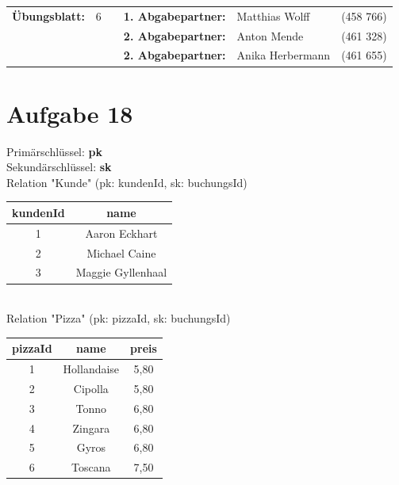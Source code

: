 \newcommand{\obenlinks}{Software Engineering}		%

\usepackage{float}


	\begin{center}
		\begin{tabular}{|rlp{4cm}rll|}
		\hline
		 \textbf{Übungsblatt:} & 6 &   & \textbf{1. Abgabepartner:} & Matthias Wolff & (458 766)  \\
		        & & & \textbf{2. Abgabepartner:} & Anton Mende & (461 328) \\
		        & & & \textbf{2. Abgabepartner:} & Anika Herbermann & (461 655) \\ \hline
		\end{tabular}
	\end{center}




\section*{Aufgabe 18}

Primärschlüssel: \textbf{pk}\\
Sekundärschlüssel: \textbf{sk}\\
Relation "Kunde" (pk: kundenId, sk: buchungsId)\\
\begin{tabular} {|c|c|}
\rowcolor{Gray}\hline
kundenId \phantom{a}&name\\\hline
1&Aaron Eckhart\\\hline
2&Michael Caine\\\hline
3&Maggie Gyllenhaal\\\hline
\end{tabular}\\

Relation "Pizza" (pk: pizzaId, sk: buchungsId)\\
\begin{tabular} {|c|c|c|}
	\rowcolor{Gray}\hline
	pizzaId&name&preis\\\hline
	1&Hollandaise&5,80\\\hline
	2&Cipolla&5,80\\\hline
	3&Tonno&6,80\\\hline
	4&Zingara&6,80\\\hline
	5&Gyros&6,80\\\hline
	6&Toscana&7,50\\\hline
\end{tabular}\\

